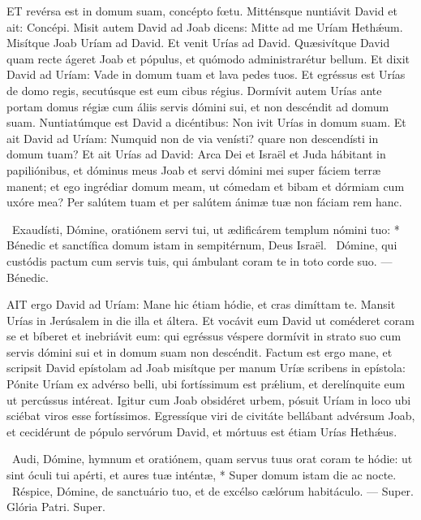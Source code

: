 
\lettrine[lines=2]{E}{T} revérsa est in domum suam, concépto fœtu. Mitténsque nuntiávit David et ait: Concépi. Misit autem David ad Joab dicens: Mitte ad me Uríam Hethǽum. Misítque Joab Uríam ad David. Et venit Urías ad David. Quæsivítque David quam recte ágeret Joab et pópulus, et quómodo administrarétur bellum. Et dixit David ad Uríam: Vade in domum tuam et lava pedes tuos. Et egréssus est Urías de domo regis, secutúsque est eum cibus régius. Dormívit autem Urías ante portam domus régiæ cum áliis servis dómini sui, et non descéndit ad domum suam. Nuntiatúmque est David a dicéntibus: Non ivit Urías in domum suam. Et ait David ad Uríam: Numquid non de via venísti? quare non descendísti in domum tuam? Et ait Urías ad David: Arca Dei et Israël et Juda hábitant in papiliónibus, et dóminus meus Joab et servi dómini mei super fáciem terræ manent; et ego ingrédiar domum meam, ut cómedam et bibam et dórmiam cum uxóre mea? Per salútem tuam et per salútem ánimæ tuæ non fáciam rem hanc.

\R\ Exaudísti, Dómine, oratiónem servi tui, ut ædificárem templum nómini tuo: * Bénedic et sanctífica domum istam in sempitérnum, Deus Israël. \V\ Dómine, qui custódis pactum cum servis tuis, qui ámbulant coram te in toto corde suo. --- Bénedic.



\lettrine[lines=2]{A}{IT} ergo David ad Uríam: Mane hic étiam hódie, et cras dimíttam te. Mansit Urías in Jerúsalem in die illa et áltera. Et vocávit eum David ut coméderet coram se et bíberet et inebriávit eum: qui egréssus véspere dormívit in strato suo cum servis dómini sui et in domum suam non descéndit. Factum est ergo mane, et scripsit David epístolam ad Joab misítque per manum Uríæ scribens in epístola: Pónite Uríam ex advérso belli, ubi fortíssimum est prǽlium, et derelínquite eum ut percússus intéreat. Igitur cum Joab obsidéret urbem, pósuit Uríam in loco ubi sciébat viros esse fortíssimos. Egressíque viri de civitáte bellábant advérsum Joab, et cecidérunt de pópulo servórum David, et mórtuus est étiam Urías Hethǽus.

\R\ Audi, Dómine, hymnum et oratiónem, quam servus tuus orat coram te hódie: ut sint óculi tui apérti, et aures tuæ inténtæ, * Super domum istam die ac nocte. \V\ Réspice, Dómine, de sanctuário tuo, et de excélso cælórum habitáculo. --- Super. Glória Patri. Super.


